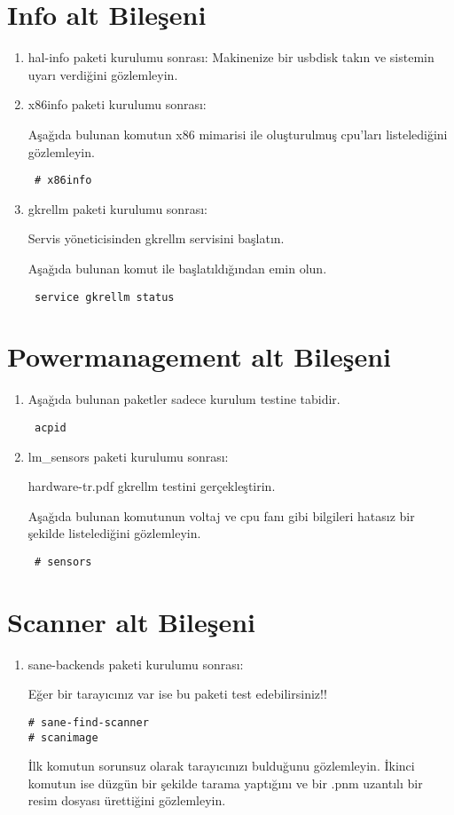 \documentclass[a4paper,10pt]{article}
\begin{document}
\section{Info alt Bileşeni}
\begin{enumerate}
 \item  hal-info paketi kurulumu sonrası:
Makinenize bir usbdisk takın ve sistemin uyarı verdiğini gözlemleyin.

 \item  x86info paketi kurulumu sonrası:

Aşağıda bulunan komutun x86 mimarisi ile oluşturulmuş cpu'ları listelediğini gözlemleyin.
\begin{verbatim}
 # x86info
\end{verbatim}


 \item gkrellm paketi kurulumu sonrası:

Servis yöneticisinden gkrellm servisini başlatın.

Aşağıda bulunan komut ile başlatıldığından emin olun.
\begin{verbatim}
 service gkrellm status
\end{verbatim}

\end{enumerate}

\section{Powermanagement alt Bileşeni}
\begin{enumerate}
\item Aşağıda bulunan paketler sadece kurulum testine tabidir.
\begin{verbatim}
 acpid
\end{verbatim}

 \item lm\_sensors paketi kurulumu sonrası:

hardware-tr.pdf gkrellm testini gerçekleştirin.

Aşağıda bulunan komutunun voltaj ve cpu fanı gibi bilgileri hatasız bir şekilde listelediğini gözlemleyin.
\begin{verbatim}
 # sensors 
\end{verbatim}

\end{enumerate}

\section{Scanner alt Bileşeni}
\begin{enumerate}
\item sane-backends paketi kurulumu sonrası:

Eğer bir tarayıcınız var ise bu paketi test edebilirsiniz!!
\begin{verbatim}
# sane-find-scanner
# scanimage 
\end{verbatim}

İlk komutun sorunsuz olarak tarayıcınızı bulduğunu gözlemleyin.
İkinci komutun ise düzgün bir şekilde tarama yaptığını ve bir .pnm uzantılı bir resim dosyası ürettiğini gözlemleyin.
\end{enumerate}
\end{document}
